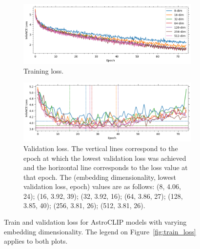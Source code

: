 \begin{figure}[t]
\centering
\begin{subfigure}{1\textwidth}
  \centering
  \includegraphics[width=0.9\linewidth]{figures/train_loss}
  \caption{Training loss.}
  \label{fig:train_loss}
\end{subfigure}%
\hfill
\begin{subfigure}{1\textwidth}
  \centering
  \includegraphics[width=0.9\linewidth]{figures/val_loss}
  \caption{Validation loss.
  The vertical lines correspond to the epoch at which the lowest validation loss was achieved and the horizontal
  line corresponds to the loss value at that epoch.
  The (embedding dimensionality, lowest validation loss, epoch) values are as follows: (8, 4.06, 24); (16, 3.92, 39);
  (32, 3.92, 16); (64, 3.86, 27); (128, 3.85, 40); (256, 3.81, 26); (512, 3.81, 26).}
  \label{fig:val_loss}
\end{subfigure}
\caption{Train and validation loss for AstroCLIP models with varying embedding dimensionality.
The legend on Figure~\eqref{fig:train_loss} applies to both plots.}
\label{fig:train_val_loss}
\end{figure}

